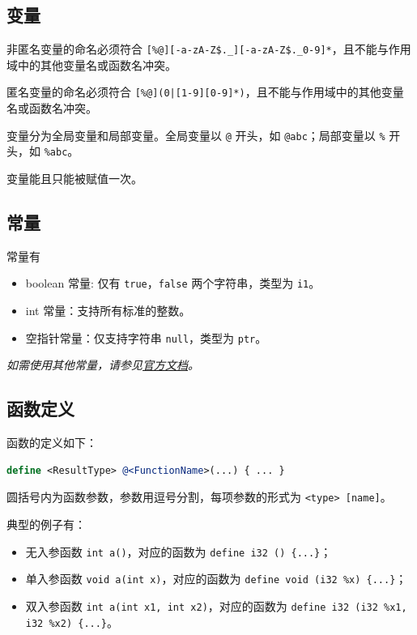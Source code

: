\subsection{变量}\label{LLVM-variables}

非匿名变量的命名必须符合 \texttt{[\%@][-a-zA-Z\$.\_][-a-zA-Z\$.\_0-9]*}，且不能与作用域中的其他变量名或函数名冲突。

匿名变量的命名必须符合 \texttt{[\%@](0|[1-9][0-9]*)}，且不能与作用域中的其他变量名或函数名冲突。

变量分为全局变量和局部变量。全局变量以 \texttt @ 开头，如 \texttt{@abc}；局部变量以 \texttt \% 开头，如 \texttt{\%abc}。

变量能且只能被赋值一次。

\subsection{常量}\label{LLVM-constants}

常量有
\begin{itemize}
  \item boolean 常量: 仅有 \texttt{true}，\texttt{false} 两个字符串，类型为 \texttt{i1}。
  \item int 常量：支持所有标准的整数。
  \item 空指针常量：仅支持字符串 \texttt{null}，类型为 \texttt{ptr}。
\end{itemize}

\textit{如需使用其他常量，请参见\href{https://llvm.org/docs/LangRef.html\#constants}{官方文档}。}

\subsection{函数定义}\label{LLVM-functions}

函数的定义如下：

\begin{lstlisting}[language=llvm]
define <ResultType> @<FunctionName>(...) { ... }
\end{lstlisting}

圆括号内为函数参数，参数用逗号分割，每项参数的形式为 \texttt{<type> [name]}。

典型的例子有：
\begin{itemize}
  \item 无入参函数 \texttt{int a()}，对应的函数为 \texttt{define i32 \@a() \{...\}}；
  \item 单入参函数 \texttt{void a(int x)}，对应的函数为 \texttt{define void \@a(i32 \%x) \{...\}}；
  \item 双入参函数 \texttt{int a(int x1, int x2)}，对应的函数为 \texttt{define i32 \@a(i32 \%x1, i32 \%x2) \{...\}}。
\end{itemize}

